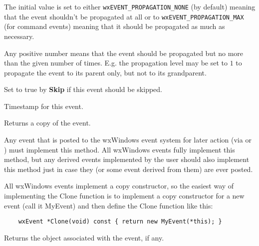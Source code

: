 The initial value is set to either {\tt wxEVENT\_PROPAGATION\_NONE} (by
default) meaning that the event shouldn't be propagated at all or to 
{\tt wxEVENT\_PROPAGATION\_MAX} (for command events) meaning that it should be
propagated as much as necessary.

Any positive number means that the event should be propagated but no more than
the given number of times. E.g. the propagation level may be set to $1$ to
propagate the event to its parent only, but not to its grandparent.



Set to true by {\bf Skip} if this event should be skipped.



Timestamp for this event.

\label{wxeventclone}


Returns a copy of the event.

Any event that is posted to the wxWindows event system for later action (via
 or
) must implement this method. All wxWindows
events fully implement this method, but any derived events implemented by the
user should also implement this method just in case they (or some event
derived from them) are ever posted.

All wxWindows events implement a copy constructor, so the easiest way of
implementing the Clone function is to implement a copy constructor for
a new event (call it MyEvent) and then define the Clone function like this:

\begin{verbatim}
    wxEvent *Clone(void) const { return new MyEvent(*this); }
\end{verbatim}



Returns the object associated with the
event, if any.



